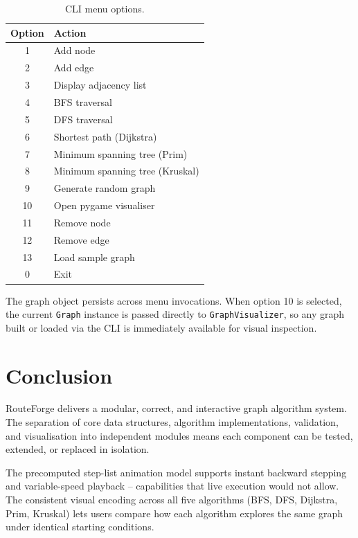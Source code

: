 \documentclass[12pt, a4paper]{article}
\begin{document}
\begin{table}[H]
\centering
\caption{CLI menu options.}
\begin{tabular}{@{}cl@{}}
\toprule
\textbf{Option} & \textbf{Action} \\
\midrule
1  & Add node \\
2  & Add edge \\
3  & Display adjacency list \\
4  & BFS traversal \\
5  & DFS traversal \\
6  & Shortest path (Dijkstra) \\
7  & Minimum spanning tree (Prim) \\
8  & Minimum spanning tree (Kruskal) \\
9  & Generate random graph \\
10 & Open pygame visualiser \\
11 & Remove node \\
12 & Remove edge \\
13 & Load sample graph \\
0  & Exit \\
\bottomrule
\end{tabular}
\end{table}

The graph object persists across menu invocations. When option 10 is
selected, the current \texttt{Graph} instance is passed directly to
\texttt{GraphVisualizer}, so any graph built or loaded via the CLI is
immediately available for visual inspection.

\section{Conclusion}
\label{sec:conc}

RouteForge delivers a modular, correct, and interactive graph algorithm
system. The separation of core data structures, algorithm implementations,
validation, and visualisation into independent modules means each
component can be tested, extended, or replaced in isolation.

The precomputed step-list animation model supports instant backward
stepping and variable-speed playback -- capabilities that live execution
would not allow. The consistent visual encoding across all five algorithms
(BFS, DFS, Dijkstra, Prim, Kruskal) lets users compare how each
algorithm explores the same graph under identical starting conditions.
\end{document}
